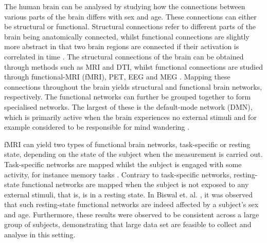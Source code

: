 
The human brain can be analysed by studying how the connections between various parts of the brain differs with sex and age. These connections can either be structural or functional. Structural connections refer to different parts of the brain being anatomically connected, whilst functional connections are slightly more abstract in that two brain regions are connected if their activation is correlated in time \cite{sporns}. The structural connections of the brain can be obtained through methods such as MRI and DTI, whilst functional connections are studied through functional-MRI (fMRI), PET, EEG and MEG \cite{hirsch}. Mapping these connections throughout the brain yields structural and functional brain networks, respectively. The functional networks can further be grouped together to form specialised networks. The largest of these is the default-mode network (DMN), which is primarily active when the brain experiences no external stimuli and for example considered to be responsible for mind wandering \cite{alves_dmn}.

fMRI can yield two types of functional brain networks, task-specific or resting state, depending on the state of the subject when the measurement is carried out. Task-specific networks are mapped whilst the subject is engaged with some activity, for instance memory tasks \cite{grady}. Contrary to task-specific networks, resting-state functional networks are mapped when the subject is not exposed to any external stimuli, that is, is in a resting state. In Biswal et. al. \cite{biswal}, it was observed that such resting-state functional networks are indeed affected by a subject's sex and age. Furthermore, these results were observed to be consistent across a large group of subjects, demonstrating that large data set are feasible to collect and analyse in this setting.


